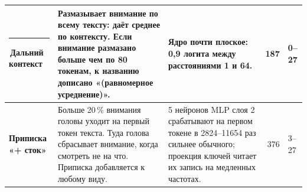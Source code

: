 \documentclass[10pt]{article}
\begin{document}
\begin{center}
{\begin{tabular}{|p{4.3cm}|p{8.9cm}|p{7.3cm}|r|p{3.0cm}|}
\textcolor[HTML]{C3C2B7}{\rule{0.62em}{0.62em}}\,\textbf{Дальний контекст} & Размазывает внимание по всему тексту: даёт среднее по контексту. Если внимание размазано больше чем по 80 токенам, к названию дописано «(равномерное усреднение)». & Ядро почти плоское: 0,9 логита между расстояниями 1 и 64. & 187 & \mbox{0–27} \\ \hline
\hline \textbf{Приписка «+ сток»} & Больше 20\,\% внимания головы уходит на первый токен текста. Туда голова сбрасывает внимание, когда смотреть не на что. Приписка добавляется к любому виду. & 5 нейронов MLP слоя 2 срабатывают на первом токене в 2824–11654 раз сильнее обычного; проекция ключей читает их запись на медленных частотах. & 376 & \mbox{3–27} \\ \hline
\hline\end{tabular}}\end{center}
\end{document}
